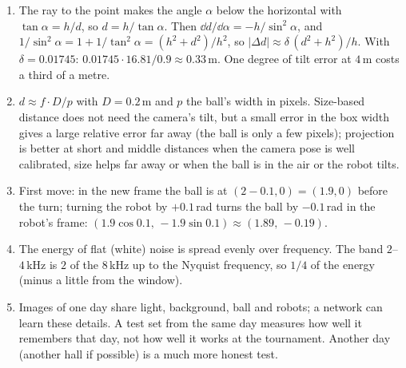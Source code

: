 \begin{enumerate}[label=\textbf{\ansnum.\arabic*}]
  \item The ray to the point makes the angle $\alpha$ below the horizontal with $\tan\alpha=h/d$, so $d=h/\tan\alpha$. Then $\dd d/\dd\alpha=-h/\sin^2\alpha$, and $1/\sin^2\alpha=1+1/\tan^2\alpha=(h^2+d^2)/h^2$, so $|\Delta d|\approx\delta\,(d^2+h^2)/h$. With $\delta=0.01745$: $0.01745\cdot16.81/0.9\approx0.33$\,m. One degree of tilt error at $4$\,m costs a third of a metre.
  \item $d\approx f\cdot D/p$ with $D=0.2$\,m and $p$ the ball's width in pixels. Size-based distance does not need the camera's tilt, but a small error in the box width gives a large relative error far away (the ball is only a few pixels); projection is better at short and middle distances when the camera pose is well calibrated, size helps far away or when the ball is in the air or the robot tilts.
  \item First move: in the new frame the ball is at $(2-0.1,0)=(1.9,0)$ before the turn; turning the robot by $+0.1$\,rad turns the ball by $-0.1$\,rad in the robot's frame: $(1.9\cos0.1,\,-1.9\sin0.1)\approx(1.89,\,-0.19)$.
  \item The energy of flat (white) noise is spread evenly over frequency. The band $2$--$4$\,kHz is $2$ of the $8$\,kHz up to the Nyquist frequency, so $1/4$ of the energy (minus a little from the window).
  \item Images of one day share light, background, ball and robots; a network can learn these details. A test set from the same day measures how well it remembers that day, not how well it works at the tournament. Another day (another hall if possible) is a much more honest test.
\end{enumerate}
